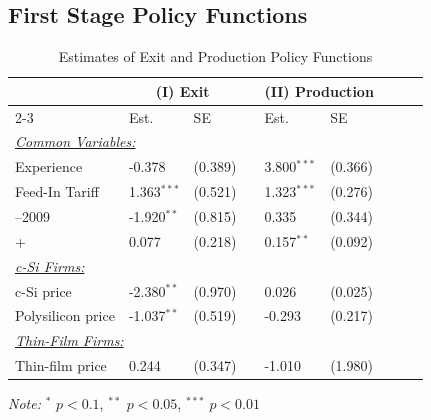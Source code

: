 \documentclass[12pt]{article}
\providecommand{\sym}[1]{\ensuremath{^{#1}}}
\begin{document}
\subsection{First Stage Policy Functions}
\begin{table}[H]
\centering
\caption{Estimates of Exit and Production Policy Functions}
\label{tab:est_policy_func}
\begin{threeparttable}
\begin{tabularx}{0.75\textwidth}{Xllllllll}
\toprule
 & \multicolumn{2}{c}{(I) Exit } && \multicolumn{2}{c}{(II) Production } \\
\cmidrule{2-3} \cmidrule{5-6}
 & Est. & SE && Est. & SE \\
\midrule
\multicolumn{6}{l}{\underline{\textit{Common Variables:}}} \\
\quad Experience & -0.378 & (0.389) && 3.800\sym{***} & (0.366) \\
\quad Feed-In Tariff & 1.363\sym{***} & (0.521) && 1.323\sym{***} & (0.276) \\
\quad 2000–2009& -1.920\sym{**} & (0.815) && 0.335 & (0.344) \\
\quad 2010+& 0.077 & (0.218) && 0.157\sym{**} & (0.092) \\

\multicolumn{6}{l}{\underline{\textit{c-Si Firms:}}} \\
\quad c-Si price
  & -2.380\sym{**} & (0.970) && 0.026 & (0.025) \\
\quad Polysilicon price
  & -1.037\sym{**} & (0.519) && -0.293 & (0.217) \\

\multicolumn{6}{l}{\underline{\textit{Thin-Film Firms:}}} \\
\quad Thin-film price 
  & 0.244 & (0.347) && -1.010 & (1.980) \\


\bottomrule
\end{tabularx}

\begin{tablenotes}
  \item \textit{Note:} \sym{*} \(p<0.1\), \sym{**} \(p<0.05\), \sym{***} \(p<0.01\)
\end{tablenotes}

\end{threeparttable}
\end{table}
\end{document}
